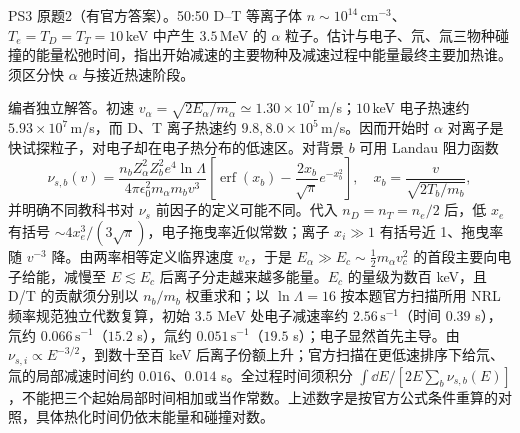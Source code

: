 \begin{exercise}\label{ex:hist02-3-2}
PS3 原题2（有官方答案）。50:50 D--T 等离子体 $n\sim10^{14}\,\mathrm{cm^{-3}}$、$T_e=T_D=T_T=10\,$keV 中产生 $3.5\,$MeV 的 $\alpha$ 粒子。估计与电子、氘、氚三物种碰撞的能量松弛时间，指出开始减速的主要物种及减速过程中能量最终主要加热谁。须区分快 $\alpha$ 与接近热速阶段。
\end{exercise}
\begin{solution}
编者独立解答。初速 $v_\alpha=\sqrt{2E_\alpha/m_\alpha}\simeq1.30\times10^7\,$m/s；$10\,$keV 电子热速约 $5.93\times10^7\,$m/s，而 D、T 离子热速约 $9.8,8.0\times10^5\,$m/s。因而开始时 $\alpha$ 对离子是快试探粒子，对电子却在电子热分布的低速区。对背景 $b$ 可用 Landau 阻力函数
\begin{equation}
\nu_{s,b}(v)=\frac{n_bZ_\alpha^2Z_b^2e^4\ln\Lambda}{4\pi\epsilon_0^2m_\alpha m_bv^3}\left[\operatorname{erf}(x_b)-\frac{2x_b}{\sqrt\pi}e^{-x_b^2}\right],\quad x_b=\frac{v}{\sqrt{2T_b/m_b}},
\end{equation}
并明确不同教科书对 $\nu_s$ 前因子的定义可能不同。代入 $n_D=n_T=n_e/2$ 后，低 $x_e$ 有括号 $\sim4x_e^3/(3\sqrt\pi)$，电子拖曳率近似常数；离子 $x_i\gg1$ 有括号近 1、拖曳率随 $v^{-3}$ 降。由两率相等定义临界速度 $v_c$，于是 $E_\alpha\gg E_c\sim\frac12m_\alpha v_c^2$ 的首段主要向电子给能，减慢至 $E\lesssim E_c$ 后离子分走越来越多能量。$E_c$ 的量级为数百 keV，且 D/T 的贡献须分别以 $n_b/m_b$ 权重求和；以 $\ln\Lambda=16$ 按本题官方扫描所用 NRL 频率规范独立代数复算，初始 $3.5$ MeV 处电子减速率约 $2.56\,\mathrm{s^{-1}}$（时间 $0.39$ s），氘约 $0.066\,\mathrm{s^{-1}}$（$15.2$ s），氚约 $0.051\,\mathrm{s^{-1}}$（$19.5$ s）；电子显然首先主导。由 $\nu_{s,i}\propto E^{-3/2}$，到数十至百 keV 后离子份额上升；官方扫描在更低速排序下给氘、氚的局部减速时间约 $0.016$、$0.014$ s。全过程时间须积分 $\int\dd E/[2E\sum_b\nu_{s,b}(E)]$，不能把三个起始局部时间相加或当作常数。上述数字是按官方公式条件重算的对照，具体热化时间仍依末能量和碰撞对数。
\end{solution}

